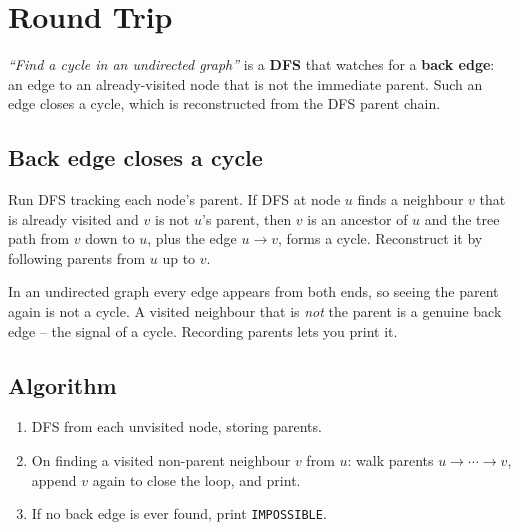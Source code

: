 \section{Round Trip}
\label{sec:cses-round-trip}


\begin{patternbox}
\emph{``Find a cycle in an undirected graph''} is a \textbf{DFS} that
watches for a \textbf{back edge}: an edge to an already-visited node that
is not the immediate parent. Such an edge closes a cycle, which is
reconstructed from the DFS parent chain.
\end{patternbox}

\subsection*{Back edge closes a cycle}

Run DFS tracking each node's parent. If DFS at node $u$ finds a neighbour
$v$ that is already visited and $v$ is not $u$'s parent, then $v$ is an
ancestor of $u$ and the tree path from $v$ down to $u$, plus the edge
$u\to v$, forms a cycle. Reconstruct it by following parents from $u$ up to
$v$.

\begin{ideabox}
In an undirected graph every edge appears from both ends, so seeing the
parent again is not a cycle. A visited neighbour that is \emph{not} the
parent is a genuine back edge -- the signal of a cycle. Recording parents
lets you print it.
\end{ideabox}

\subsection*{Algorithm}

\begin{enumerate}
  \item DFS from each unvisited node, storing parents.
  \item On finding a visited non-parent neighbour $v$ from $u$: walk
        parents $u\to\cdots\to v$, append $v$ again to close the loop, and
        print.
  \item If no back edge is ever found, print \texttt{IMPOSSIBLE}.
\end{enumerate}

